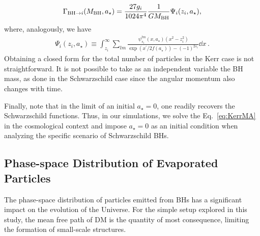 \documentclass[aps,prd,reprint,twocolumn,preprintnumbers,floatfix,nofootinbib]{revtex4-1}
\newcommand{\MBH}{M_{\rm BH}}
\newcommand{\as}{a_\star}
\begin{document}
\begin{align}\label{eq:HwtotrateK}
    \Gamma_{{\rm BH} \to i}(\MBH,\as)= \frac{27 g_i}{1024\pi^4}\frac{1}{G\MBH} \Psi_i (z_i,\as),
\end{align}
where, analogously, we have
\begin{align}
    \Psi_i (z_i,\as) \equiv \int_{z_i}^\infty\sum_{lm}\frac{\,\psi_{s_i}^{lm}(x,\as)(x^2-z_i^2)}{\exp(x^\prime/2f(\as))-(-1)^{2s_i}}\dd{x}\,.
\end{align}
Obtaining a closed form for the total number of particles in the Kerr case is not straightforward. It is not possible to take as an independent variable the BH mass, as done in the Schwarzschild case since the angular momentum also changes with time. 

Finally, note that in the limit of an initial $a_\star = 0$, one readily recovers the Schwarzschild functions. Thus, in our simulations, we solve the Eq.~\eqref{eq:KerrMA} in the cosmological context and impose $a_\star=0$ as an initial condition when analyzing the specific scenario of Schwarzschild BHs.  

\subsection{Phase-space Distribution of Evaporated Particles}
\label{sec:psd}
The phase-space distribution of particles emitted from BHs has a significant impact on the evolution of the Universe. For the simple setup explored in this study, the mean free path of DM is the quantity of most consequence, limiting the formation of small-scale structures.    
\end{document}
